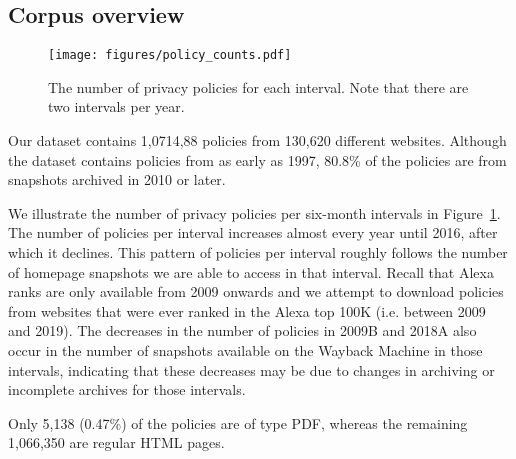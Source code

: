 \subsection{Corpus overview}
\label{subsec:data-overview}

\begin{figure}[t]
\centering
\texttt{[image: figures/policy\_counts.pdf]}
\caption{The number of privacy policies for each interval. Note that there are two intervals per year.}
\label{fig:numpolicies}
\end{figure}

Our dataset contains 1,0714,88 policies from 130,620 different websites.
Although the dataset contains policies from as early as 1997, 80.8\% of the policies are from snapshots archived in 2010 or later.

We illustrate the number of privacy policies per six-month intervals in Figure~\ref{fig:numpolicies}.
The number of policies per interval increases almost every year until 2016, after which it declines. This pattern of policies per interval roughly follows the number of homepage snapshots we are able to access in that interval. 
Recall that Alexa ranks are only available from 2009 onwards and we attempt to download policies from websites that were ever ranked in the Alexa top 100K (i.e. between 2009 and 2019).
The decreases in the number of policies in 2009B and 2018A also occur in the number of snapshots available on the Wayback Machine in those intervals, indicating that these decreases may be due to changes in archiving or incomplete archives for those intervals.

Only 5,138 (0.47\%) of the policies are of type PDF, whereas the remaining 1,066,350 are regular HTML pages.






